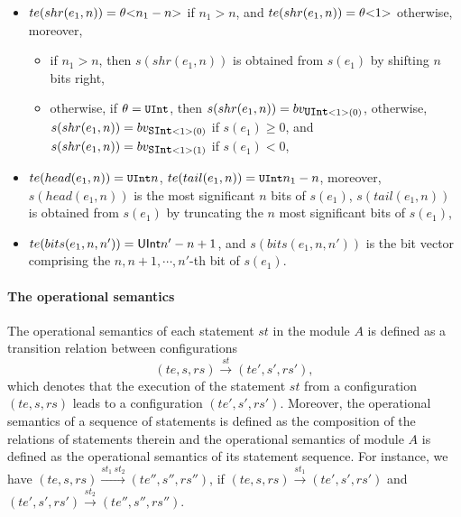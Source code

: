 \begin{itemize}
\begin{itemize}
%
\item $te(shr(e_1, n)) = \theta \mbox{<} n_1-n \mbox{>}$ if $n_1 > n$, and $te(shr(e_1, n)) =  \theta \mbox{<} 1 \mbox{>}$ otherwise,  moreover,
\begin{itemize}
\item if $n_1 > n$, then $s(shr(e_1, n))$ is obtained from $s(e_1)$ by shifting $n$ bits right,
%
\item otherwise, if $\theta = \mbox{\prettyll{UInt}}$, then $s(shr(e_1, n))=bv_{\mbox{\prettyll{UInt}}<1>(0)}$, otherwise, $s(shr(e_1, n))=bv_{\mbox{\prettyll{SInt}}<1>(0)}$ if $s(e_1) \ge 0$, and $s(shr(e_1, n))=bv_{\mbox{\prettyll{SInt}}<1>(1)}$ if $s(e_1) < 0$,
\end{itemize}
%
\item $te(head(e_1, n)) = { \mbox{\prettyll{UInt}}}{n}$, $te(tail(e_1, n)) = { \mbox{\prettyll{UInt}}}{n_1-n}$, moreover, $s(head(e_1, n))$ is the most significant $n$ bits of $s(e_1)$, $s(tail(e_1, n))$ is obtained from $s(e_1)$ by truncating the $n$ most significant bits of $s(e_1)$,
%
\item $te(bits(e_1, n, n')) = {\sf UInt}{n'-n+1}$, and $s(bits(e_1, n, n'))$ is the bit vector comprising the $n, n+1, \cdots, n'$-th bit of $s(e_1)$.
\end{itemize}
%
\end{itemize}

\paragraph*{The operational semantics}
The operational semantics of each statement $st$ in the module $A$ is defined as a transition relation between configurations
$$(te, s, rs) \xrightarrow{st} (te', s', rs'),$$
which denotes that the execution of the statement $st$ from a configuration $(te, s, rs)$ leads to a configuration $(te', s', rs')$.
Moreover, the operational semantics of a sequence of statements is defined as the composition of the relations of statements therein and the operational semantics of module $A$ is defined as the operational semantics of its statement sequence.
For instance, we have $(te, s, rs) \xrightarrow{st_1\ st_2} (te'', s'', rs'')$, if $(te, s, rs) \xrightarrow{st_1} (te', s', rs')$
and  $(te', s', rs') \xrightarrow{st_2} (te'', s'', rs'')$.

